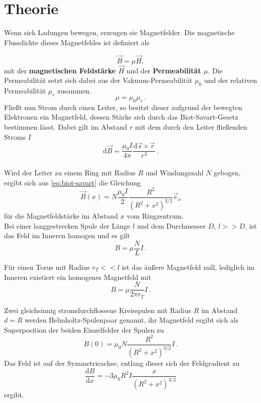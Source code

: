 \section{Theorie}
\label{sec:Theorie}
Wenn sich Ladungen bewegen, erzeugen sie Magnetfelder. Die magnetische Flussdichte
dieses Magnetfeldes ist definiert als

\begin{equation}
    \label{eq:BmuH}
    \vec{B}=μ\vec{H},
\end{equation}
mit der \textbf{magnetischen Feldstärke $\vec{H}$} und der \textbf{Permeabilität $μ$}.
Die Permeabilität setzt sich dabei aus der Vakuum-Permeabilität $μ_0$ und der relativen
Permeabilität $μ_r$ zusammen.
\begin{equation}
    μ = μ_0μ_r\,.
\end{equation}
Fließt nun Strom durch einen Leiter, so besitzt dieser aufgrund der bewegten Elektronen
ein Magnetfeld, dessen Stärke sich durch das Biot-Savart-Gesetz bestimmen lässt.
Dabei gilt im Abstand $r$ mit dem durch den Leiter fließenden Stroms $I$
\begin{equation}
    \label{eq:biot-savart}
    \text{d}\vec{B}= \dfrac{μ_0 I}{4π} \dfrac{\text{d}\vec{s} \times \vec{r}}{r^3}\,.
\end{equation}\\

Wird der Leiter zu einem Ring mit Radius $R$ und Windungszahl $N$ gebogen, ergibt sich
aus \eqref{eq:biot-savart} die Gleichung
\begin{equation}
    \vec{B}(x) = N\dfrac{μ_0I}{2}\dfrac{R^2}{(R^2+x^2)^{3/2}} \vec{e}_x
\end{equation}
für die Magnetfeldstärke im Abstand $x$ vom Ringzentrum.\\

Bei einer langgestrecken Spule der Länge $l$ und dem Durchmesser $D$, $l>>D$, ist das Feld im
Inneren homogen und es gilt
\begin{equation}
    B=μ\dfrac{N}{L}I\,.
    \label{LangB}
\end{equation} 

Für einen Torus mit Radius $r_T<<l$ ist das äußere Magnetfeld null, lediglich im Inneren
existiert ein homogenes Magnetfeld mit
\begin{equation}
    B=μ\dfrac{N}{2πr_T}I\,.
    \label{RingB}
\end{equation}

Zwei gleichsinnig stromdurchflossene Kreisspulen mit Radius $R$ im Abstand $d=R$ werden
Helmholtz-Spulenpaar genannt, ihr Magnetfeld ergibt sich als Superposition der beiden
Einzelfelder der Spulen zu
\begin{equation}
    B(0)=μ_0N\dfrac{R^2}{(R^2+x^2)^{3/2}}I\,.
    \label{eq:HelmholtzB}
\end{equation}
Das Feld ist auf der Symmetrieachse, entlang dieser sich der Feldgradient zu
\begin{equation}
    \dfrac{\text{d}B}{\text{d}x} = -3μ_0R^2I\dfrac{x}{(R^2+x^2)^{3/2}}
\end{equation} ergibt.


